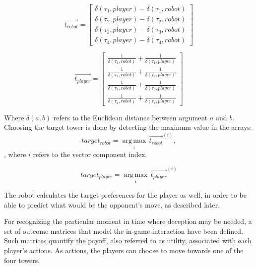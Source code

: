 \begin{equation}
\overrightarrow{t_{robot}} = \begin{bmatrix}
\delta(\tau_{1},player) -\delta(\tau_{1},robot)  \\ 
\delta(\tau_{2},player) - \delta(\tau_{2},robot)  \\
\delta(\tau_{3},player) - \delta(\tau_{3},robot) \\
\delta(\tau_{4},player) - \delta(\tau_{4},robot)
\end{bmatrix}
\label{eq:array1}
\end{equation}

\begin{equation}
\overrightarrow{t_{player}} = \begin{bmatrix}
\frac{1}{\delta(\tau_{1},robot)} + \frac{1}{\delta(\tau_{1},player)} \\ 
\frac{1}{\delta(\tau_{2},robot)} + \frac{1}{\delta(\tau_{2},player)}  \\
\frac{1}{\delta(\tau_{3},robot)} + \frac{1}{\delta(\tau_{3},player)}  \\
\frac{1}{\delta(\tau_{4},robot)} + \frac{1}{\delta(\tau_{4},player)} 
\end{bmatrix}
\label{eq:array2}
\end{equation}

Where $\delta(a,b)$ refers to the Euclidean distance between argument $a$ and $b$. Choosing the target tower is done by detecting the maximum value in the arrays:
\begin{equation}
target_{robot} = \operatorname*{arg\,max}_i \, \overrightarrow{t_{robot}}^{(i)}, 
\end{equation}, where $i$ refers to the vector component index.

\begin{equation}
target_{player} = \operatorname*{arg\,max}_i \, \overrightarrow{t_{player}}^{(i)}
\end{equation}

The robot calculates the target preferences for the player as well, in order to be able to predict what would be the opponent's move, as described later.

For recognizing the particular moment in time where deception may be needed, a set of outcome matrices that model the in-game interaction have been defined. Such matrices quantify the payoff, also referred to as utility, associated with each player's actions. As actions, the players can choose to move towards one of the four towers. 

